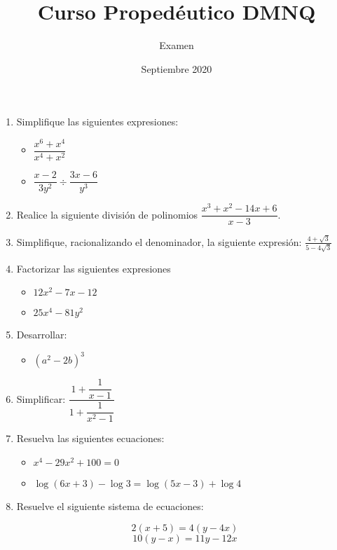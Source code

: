 \documentclass{article}
\title{Curso Propedéutico DMNQ}
\author{Examen}
\date{Septiembre 2020}
\begin{document}
\maketitle


\begin{enumerate}
    
\item{Simplifique las siguientes expresiones:}

\begin{itemize}
    \item $\dfrac{x^6 + x^4}{x^4 + x^2}$
    \item $ \dfrac{x - 2}{3y^2} \div \dfrac{3x - 6}{y^3}$
\end{itemize}

\item Realice la siguiente división de polinomios $\dfrac{x^3 + x^2 - 14x + 6}{x - 3}.$

\item  Simplifique, racionalizando el denominador, la siguiente expresión:
$\frac{4+\sqrt{3}}{5-4\sqrt{3}}$

\item{Factorizar las siguientes expresiones}

\begin{itemize}
    \item $12x^2 - 7x -12$
    \item $25x^4 - 81y^2$
\end{itemize}

\item Desarrollar:

\begin{itemize}
    \item $(a^2 - 2b)^3$
\end{itemize}

\item Simplificar:
$\dfrac{1 +\dfrac{1}{x-1}
}{1 + \dfrac{1}{x^2-1}}$

\item Resuelva las siguientes ecuaciones:

\begin{itemize}
    \item $x^4 -29x^2 + 100 = 0$
    \item $\log (6x + 3) - \log 3 = \log (5x - 3) + \log 4$
\end{itemize}

\item  Resuelve el siguiente sistema de ecuaciones:

$$2(x + 5) = 4(y - 4x)$$
$$10(y - x) = 11y - 12x$$


\end{enumerate}
\end{document}
